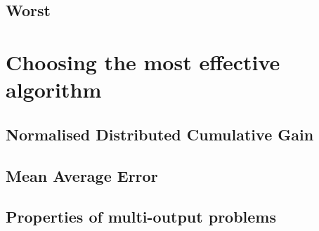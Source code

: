 \subsection{Worst}


\section{Choosing the most effective algorithm}
\label{pred:choosing}

\subsection{Normalised Distributed Cumulative Gain}
\subsection{Mean Average Error}
\subsection{Properties of multi-output problems}
\label{sub:multi}

